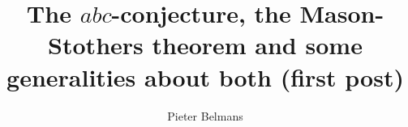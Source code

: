 \documentclass[11pt, a4paper, openany, oneside, article]{memoir}
\begin{document}
\title{The $abc$-conjecture, the Mason-Stothers theorem and some generalities about both (first post)}
\author{Pieter Belmans}
\maketitle






\end{document}
